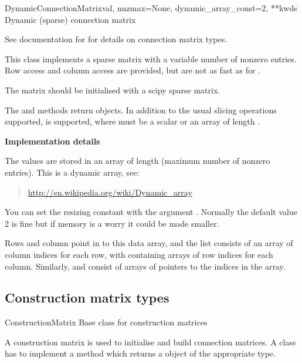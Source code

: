\documentclass[letterpaper,10pt,english]{manual}
\begin{document}
\hypertarget{brian.DynamicConnectionMatrix}{}\begin{classdesc}{DynamicConnectionMatrix}{val, nnzmax=None, dynamic\_array\_const=2, **kwds}
Dynamic (sparse) connection matrix

See documentation for \hyperlink{brian.ConnectionMatrix}{} for details on
connection matrix types.

This class implements a sparse matrix with a variable number of nonzero
entries. Row access and column access are provided, but are not as fast
as for \hyperlink{brian.SparseConnectionMatrix}{}.

The matrix should be initialised with a scipy sparse matrix.

The  and  methods return
\hyperlink{brian.SparseConnectionVector}{} objects. In addition to the
usual slicing operations supported,  is supported, where
 must be a scalar or an array of length .

\textbf{Implementation details}

The values are stored in an array  of length  (maximum
number of nonzero entries). This is a dynamic array, see:
\begin{quote}

\href{http://en.wikipedia.org/wiki/Dynamic\_array}{http://en.wikipedia.org/wiki/Dynamic\_array}
\end{quote}

You can set the resizing constant with the argument .
Normally the default value 2 is fine but if memory is a worry it could be
made smaller.

Rows and column point in to this data array, and the list  consists
of an array of column indices for each row, with  containing arrays
of row indices for each column. Similarly,  and 
consist of arrays of pointers to the indices in the  array.
\end{classdesc}


\subsection{Construction matrix types}

\hypertarget{brian.ConstructionMatrix}{}\begin{classdesc}{ConstructionMatrix}{}
Base class for construction matrices

A construction matrix is used to initialise and build connection matrices.
A  class has to implement a method
 which returns a \hyperlink{brian.ConnectionMatrix}{}
object of the appropriate type.
\end{classdesc}
\end{document}
